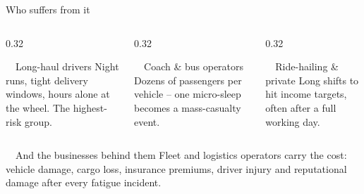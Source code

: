 \documentclass[aspectratio=169, 10pt]{beamer}
\begin{document}
\begin{frame}{Who suffers from it}
  \vspace{0.3em}
  \begin{columns}[T]
    \begin{column}{0.32\textwidth}
      \begin{card}{\faTruck~~Long-haul drivers}
        \scriptsize Night runs, tight delivery windows, hours alone at the wheel. The highest-risk group.
      \end{card}
    \end{column}
    \begin{column}{0.32\textwidth}
      \begin{card}{\faBus~~Coach \& bus operators}
        \scriptsize Dozens of passengers per vehicle -- one micro-sleep becomes a mass-casualty event.
      \end{card}
    \end{column}
    \begin{column}{0.32\textwidth}
      \begin{card}{\faCarSide~~Ride-hailing \& private}
        \scriptsize Long shifts to hit income targets, often after a full working day.
      \end{card}
    \end{column}
  \end{columns}
  \vspace{1.0em}
  \begin{center}
    \begin{goldcard}[width=0.92\textwidth]{\faBuilding~~And the businesses behind them}
      \small Fleet and logistics operators carry the cost: vehicle damage, cargo loss, insurance premiums, driver injury and reputational damage after every fatigue incident.
    \end{goldcard}
  \end{center}
\end{frame}
\end{document}
